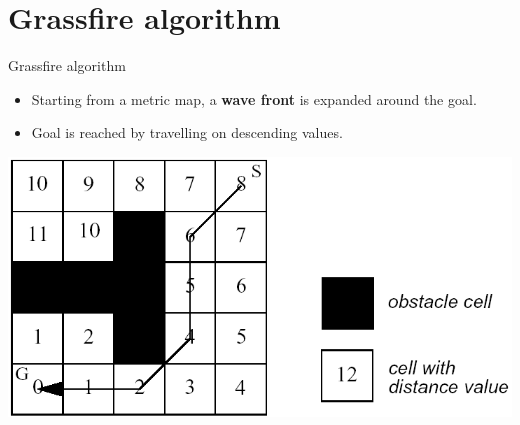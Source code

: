 \documentclass[compress,xcolor=table]{beamer}
\begin{document}
\section{Grassfire algorithm}

\begin{frame}{Grassfire algorithm}

\begin{itemize}
    \item Starting from a metric map, a \textbf{wave front} is expanded around the goal.
\item Goal is reached by travelling on descending values.
\end{itemize}

    \begin{center}
        \includegraphics[width=0.7\linewidth]{grassfire}
    \end{center}
\end{frame}
\end{document}
